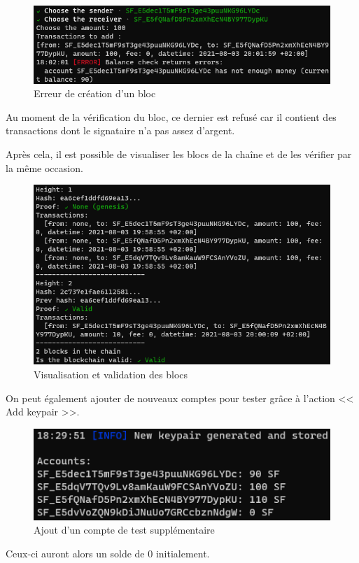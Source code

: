 \newpage

\begin{figure}[H]
  \centering
  \includegraphics[width=\textwidth]{images/chain_balance_error.png}
  \caption{Erreur de création d'un bloc}
\end{figure}

Au moment de la vérification du bloc, ce dernier est refusé car il contient des transactions dont le signataire n'a pas assez d'argent.

Après cela, il est possible de visualiser les blocs de la chaîne et de les vérifier par la même occasion.

\begin{figure}[H]
  \centering
  \includegraphics[width=\textwidth]{images/chain_blocks.png}
  \caption{Visualisation et validation des blocs}
\end{figure}

\newpage

On peut également ajouter de nouveaux comptes pour tester grâce à l'action << Add keypair >>.

\begin{figure}[H]
  \centering
  \includegraphics[width=\textwidth]{images/chain_add_keypair.png}
  \caption{Ajout d'un compte de test supplémentaire}
\end{figure}

Ceux-ci auront alors un solde de 0 initialement.